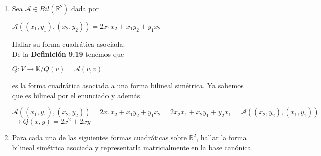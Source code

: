 \documentclass{article}
\newcommand{\R}{\mathbb{R}}
\newcommand{\A}{\mathcal{A}}
\newenvironment{tightcenter}{%
    \setlength\topsep{0pt}
    \setlength\parskip{0pt}
    \begin{center}
}{%
    \end{center}
}
\begin{document}
\begin{enumerate}
        \item Sea $\A\in Bil(\R^2)$ dada por
            \begin{center}
                $\A((x_1,y_1),(x_2,y_2))=2x_1x_2+x_1y_2+y_1x_2$
            \end{center}
            Hallar su forma cuadrática asociada.\\
            De la \textbf{Definición 9.19} tenemos que
            \begin{tightcenter}
                $Q:V\to \mathbb{K}/Q(v)=\A(v,v)$
            \end{tightcenter}
            es la forma cuadrática asociada a una forma bilineal simétrica. Ya sabemos que es bilineal por el enunciado y además
            \begin{tightcenter}
                $\A((x_1,y_1),(x_2,y_2))=2x_1x_2+x_1y_2+y_1x_2=2x_2x_1+x_2y_1+y_2x_1=\A((x_2,y_2),(x_1,y_1))$\\
                $\to Q(x,y)=2x^2+2xy$
            \end{tightcenter}
        \item Para cada una de las siguientes formas cuadráticas sobre $\R^2$, hallar la forma bilineal simétrica asociada y representarla matricialmente en la base canónica.
\end{enumerate}
\end{document}
